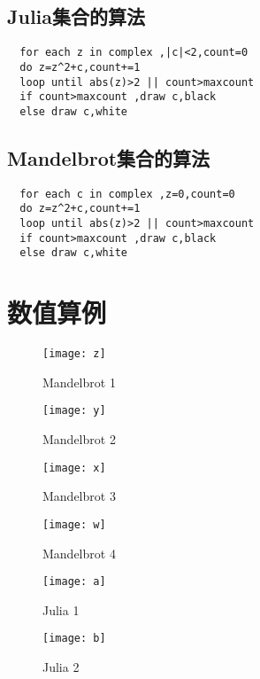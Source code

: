 \documentclass{ctexart}
\begin{document}
\subsection{Julia集合的算法}
\begin{verbatim}
  for each z in complex ,|c|<2,count=0
  do z=z^2+c,count+=1
  loop until abs(z)>2 || count>maxcount
  if count>maxcount ,draw c,black
  else draw c,white
\end{verbatim}

\subsection{Mandelbrot集合的算法}
\begin{verbatim}
  for each c in complex ,z=0,count=0
  do z=z^2+c,count+=1
  loop until abs(z)>2 || count>maxcount
  if count>maxcount ,draw c,black
  else draw c,white
\end{verbatim}

\section{数值算例}
\begin{figure}[H]
  \centering
  \begin{minipage}[t]{0.48\textwidth}
    \centering
    \texttt{[image: z]}
    \caption{Mandelbrot 1}
  \end{minipage}
  \begin{minipage}[t]{0.48\textwidth}
    \centering
    \texttt{[image: y]}
    \caption{Mandelbrot 2}
  \end{minipage}
\end{figure}

\begin{figure}[H]
  \centering
  \begin{minipage}[t]{0.48\textwidth}
    \centering
    \texttt{[image: x]}
    \caption{Mandelbrot 3}
  \end{minipage}
  \begin{minipage}[t]{0.48\textwidth}
    \centering
    \texttt{[image: w]}
    \caption{Mandelbrot 4}
  \end{minipage}
\end{figure}

\begin{figure}[H]
  \centering
  \begin{minipage}[t]{0.48\textwidth}
    \centering
    \texttt{[image: a]}
    \caption{Julia 1}
  \end{minipage}
  \begin{minipage}[t]{0.48\textwidth}
    \centering
    \texttt{[image: b]}
    \caption{Julia 2}
  \end{minipage}
\end{figure}
\end{document}
